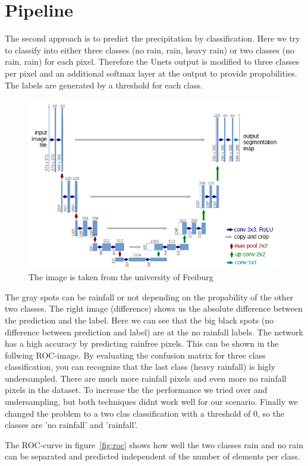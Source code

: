 \documentclass[oneside]{htwg-report}
\begin{document}
\section*{Pipeline}
The second approach is to predict the precipitation by classification. Here we try to classify into either three classes (no rain, rain, heavy rain) or two classes (no rain, rain) for each pixel.
Therefore the Unets output is modified to three classes per pixel and an additional softmax layer at the output to provide propabilities. The labels are generated by a threshold for each class.

\begin{figure}[ht]
    \centering
    \includegraphics[width=0.8\linewidth]{../pics/UNet_Biomedical}
    \caption{The image is taken from the university of Freiburg~\cite{ronneberger2015u}}
\end{figure}


The gray spots can be rainfall or not depending on the propability of the other two classes. The right image (difference) shows us the absolute difference between the prediction and the label.
Here we can see that the big black spots (no difference between prediction and label) are at the no rainfall labels.
The network has a high accuracy by predicting rainfree pixels. This can be shown in the follwing ROC-image. 
By evaluating the confusion matrix for three class classification, you can recognize that the last class (heavy rainfall) is higly undersampled. 
There are much more rainfall pixels and even more no rainfall pixels in the dataset. To increase the the performance we tried over and undersampling, but both techniques didnt work well for our scenario.
Finally we changed the problem to a two clas classification with a threshold of 0, so the classes are 'no rainfall' and 'rainfall'.

The ROC-curve in figure~\ref{fig:roc} shows how well the two classes rain and no rain can be separated and predicted independent of the number of elements per class.
\end{document}
